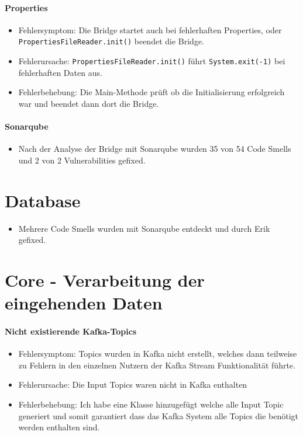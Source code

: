 \paragraph{Properties}
\begin{itemize}
	\item Fehlersymptom: Die Bridge startet auch bei fehlerhaften Properties, oder \texttt{PropertiesFileReader.init()} beendet die Bridge.
	\item Fehlerursache: \texttt{PropertiesFileReader.init()} führt \texttt{System.exit(-1)} bei fehlerhaften Daten aus.
	\item Fehlerbehebung: Die Main-Methode prüft ob die Initialisierung erfolgreich war und beendet dann dort die Bridge.
\end{itemize}

\paragraph{Sonarqube}
\begin{itemize}
	\item Nach der Analyse der Bridge mit Sonarqube wurden 35 von 54 Code Smells und 2 von 2 Vulnerabilities gefixed.
\end{itemize}

\section{Database}
\begin{itemize}
	\item Mehrere Code Smells wurden mit Sonarqube entdeckt und durch Erik gefixed.
\end{itemize}
\newpage
\section{Core - Verarbeitung der eingehenden Daten}
\paragraph{Nicht existierende Kafka-Topics}
\begin{itemize}
	\item Fehlersymptom: Topics wurden in Kafka nicht erstellt, welches dann teilweise zu Fehlern in den einzelnen Nutzern der Kafka Stream Funktionalität führte.
	\item Fehlerursache: Die Input Topics waren nicht in Kafka enthalten
	\item Fehlerbehebung: Ich habe eine Klasse hinzugefügt welche alle Input Topic generiert und somit garantiert dass das Kafka System alle Topics die benötigt werden enthalten sind. 
\end{itemize}

